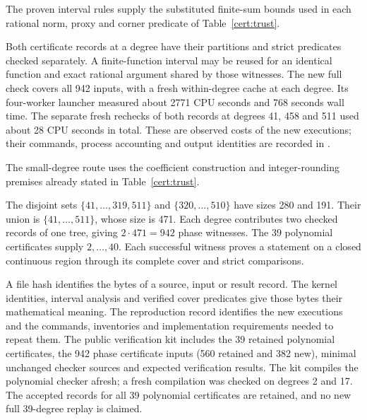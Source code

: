 The proven interval rules supply the substituted finite-sum bounds
used in each rational norm, proxy and corner predicate of
Table~\ref{cert:trust}.

Both certificate records at a degree have their partitions and strict predicates
checked separately. A finite-function interval may be reused for an
identical function and exact rational argument shared by those witnesses.
The new full check covers all 942 inputs, with a fresh within-degree
cache at each degree. Its four-worker launcher measured about 2771 CPU
seconds and 768 seconds wall time. The separate fresh rechecks of
both records at degrees 41, 458 and 511 used about 28 CPU seconds in total.
These are observed costs of the new executions; their commands, process
accounting and output identities are recorded in
.

The small-degree route uses the coefficient construction and
integer-rounding premises already stated in Table~\ref{cert:trust}.

The disjoint sets $\{41,\ldots,319,511\}$ and
$\{320,\ldots,510\}$ have sizes 280 and 191. Their union is
$\{41,\ldots,511\}$, whose size is 471. Each degree contributes two
checked records of one tree, giving $2\cdot471=942$ phase witnesses.
The 39 polynomial certificates supply $2,\ldots,40$. Each successful
witness proves a statement on a closed continuous region through its
complete cover and strict comparisons.

A file hash identifies the bytes of a source, input or result record.
The kernel identities, interval analysis and verified cover predicates
give those bytes their mathematical meaning. The reproduction record
 identifies the new executions and the
commands, inventories and implementation requirements needed to repeat
them. The public verification kit includes the 39 retained polynomial
certificates, the 942 phase certificate inputs (560 retained and 382 new),
minimal unchanged checker sources and expected verification results.
The kit compiles the polynomial checker afresh; a fresh compilation was
checked on degrees 2 and 17. The accepted records for all 39 polynomial
certificates are retained, and no new full 39-degree replay is claimed.
